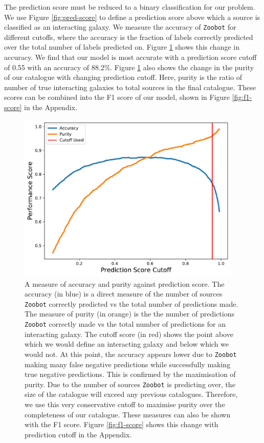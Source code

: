 The prediction score must be reduced to a binary classification for our problem. We use Figure \ref{fig:pred-score} to define a prediction score above which a source is classified as an interacting galaxy. We measure the accuracy of \texttt{Zoobot} for different cutoffs, where the accuracy is the fraction of labels correctly predicted over the total number of labels predicted on. Figure \ref{fig:accuracy-graph} shows this change in accuracy. We find that our model is most accurate with a prediction score cutoff of 0.55 with an accuracy of 88.2\%. Figure \ref{fig:accuracy-graph} also shows the change in the purity of our catalogue with changing prediction cutoff. Here, purity is the ratio of number of true interacting galaxies to total sources in the final catalogue. These scores can be combined into the F1 score of our model, shown in Figure \ref{fig:f1-score} in the Appendix.

\begin{figure}
  \centering
  \includegraphics[width=0.95\textwidth]{Chapter2/figures/fig4.pdf}
  \caption[A measure of accuracy and purity against prediction score.]{A measure of accuracy and purity against prediction score. The accuracy (in blue) is a direct measure of the number of sources \texttt{Zoobot} correctly predicted vs the total number of predictions made. The measure of purity (in orange) is the the number of predictions \texttt{Zoobot} correctly made vs the total number of predictions for an interacting galaxy. The cutoff score (in red) shows the point above which we would define an interacting galaxy and below which we would not. At this point, the accuracy appears lower due to \texttt{Zoobot} making many false negative predictions while successfully making true negative predictions. This is confirmed by the maximisation of purity. Due to the number of sources \texttt{Zoobot} is predicting over, the size of the catalogue will exceed any previous catalogues. Therefore, we use this very conservative cutoff to maximise purity over the completeness of our catalogue. These measures can also be shown with the F1 score. Figure \ref{fig:f1-score} shows this change with prediction cutoff in the Appendix.}
  \label{fig:accuracy-graph}
\end{figure}

